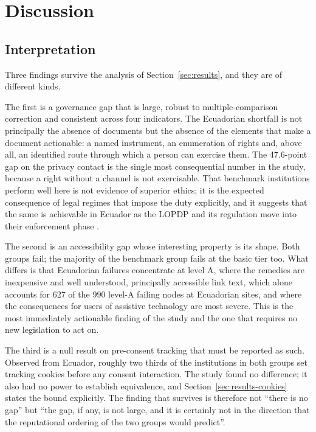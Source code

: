 \documentclass[pdflatex,sn-basic,Numbered,iicol]{sn-jnl}
\theoremstyle{thmstyleone}
\theoremstyle{thmstyletwo}
\theoremstyle{thmstylethree}
\begin{document}
\section{Discussion}\label{sec:discussion}

\subsection{Interpretation}\label{sec:discussion-interp}

Three findings survive the analysis of Section~\ref{sec:results}, and they are of different kinds.

The first is a governance gap that is large, robust to multiple-comparison correction and consistent across four indicators. The Ecuadorian shortfall is not principally the absence of documents but the absence of the elements that make a document actionable: a named instrument, an enumeration of rights and, above all, an identified route through which a person can exercise them. The 47.6-point gap on the privacy contact is the single most consequential number in the study, because a right without a channel is not exercisable. That benchmark institutions perform well here is not evidence of superior ethics; it is the expected consequence of legal regimes that impose the duty explicitly, and it suggests that the same is achievable in Ecuador as the LOPDP and its regulation move into their enforcement phase \citep{lopdp2021,reglamentolopdp2023}.

The second is an accessibility gap whose interesting property is its shape. Both groups fail; the majority of the benchmark group fails at the basic tier too. What differs is that Ecuadorian failures concentrate at level A, where the remedies are inexpensive and well understood, principally accessible link text, which alone accounts for 627 of the 990 level-A failing nodes at Ecuadorian sites, and where the consequences for users of assistive technology are most severe. This is the most immediately actionable finding of the study and the one that requires no new legislation to act on.

The third is a null result on pre-consent tracking that must be reported as such. Observed from Ecuador, roughly two thirds of the institutions in both groups set tracking cookies before any consent interaction. The study found no difference; it also had no power to establish equivalence, and Section~\ref{sec:results-cookies} states the bound explicitly. The finding that survives is therefore not ``there is no gap'' but ``the gap, if any, is not large, and it is certainly not in the direction that the reputational ordering of the two groups would predict''.
\end{document}
